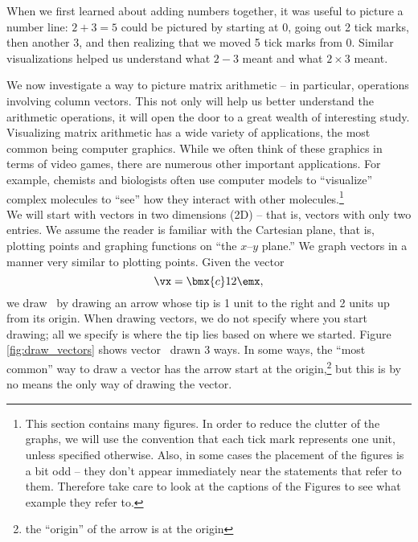 
\label{sec:geom_1}




When we first learned about adding numbers together, it was useful to picture a number line: $2+3=5$ could be pictured by starting at 0, going out 2 tick marks, then another 3, and then realizing that we moved 5 tick marks from 0. Similar visualizations helped us understand what $2-3$ meant and what $2\times 3$ meant.


We now investigate a way to picture matrix arithmetic -- in particular, operations involving column vectors. This not only will help us better understand the arithmetic operations, it will open the door to a great wealth of interesting study. Visualizing matrix arithmetic has a wide variety of applications, the most common being computer graphics. While we often think of these graphics in terms of video games, there are numerous other important applications. For example, chemists and biologists often use computer models to ``visualize'' complex molecules to ``see'' how they interact with other molecules.\footnote{This section contains many figures. In order to reduce the clutter of the graphs, we will use the convention that each tick mark represents one unit, unless specified otherwise. Also, in some cases the placement of the figures is a bit odd -- they don't appear immediately near the statements that refer to them. Therefore take care to look at the captions of the Figures to see what example they refer to.}\\


We will start with vectors in two dimensions (2D) -- that is, vectors with only two entries. We assume the reader is familiar with the Cartesian plane, that is, plotting points and graphing functions on ``the $x$--$y$ plane.'' We graph vectors in a manner very similar to plotting points. Given the vector $$\vx = \bmx{c}1\\2\emx,$$ we draw \vx\ by drawing an arrow whose tip is 1 unit to the right and 2 units up from its origin. When drawing vectors, we do not specify where you start drawing; all we specify is where the tip lies based on where we started. Figure \ref{fig:draw_vectors} shows vector \vx\ drawn 3 ways. In some ways, the ``most common'' way to draw a vector has the arrow start at the origin,\footnote{the ``origin'' of the arrow is at the origin} but this is by no means the only way of drawing the vector.

